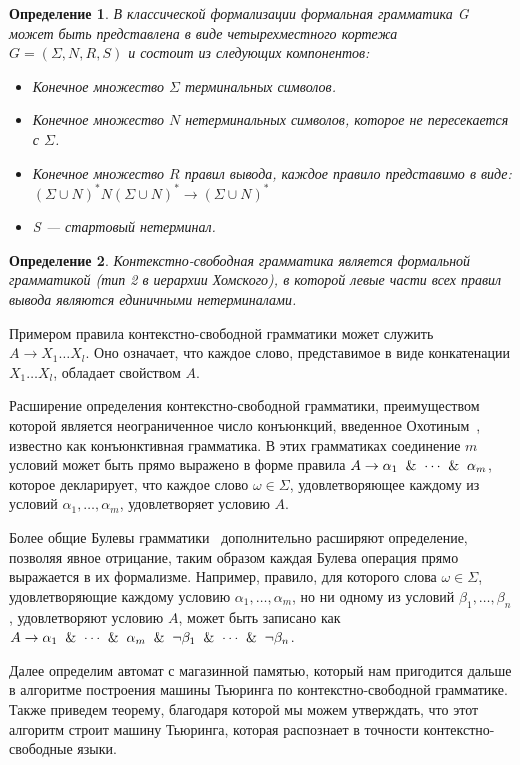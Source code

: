 \documentclass[14pt]{matmex-diploma-custom}
\newtheorem{defn}{Определение}[subsection]
\begin{document}
\begin{defn}
В классической формализации формальная грамматика G может быть представлена 
в виде четырехместного кортежа $G = (\Sigma, N, R, S)$ и состоит из следующих компонентов:
\begin{itemize}
    \item Конечное множество $\Sigma$ терминальных символов.
    \item Конечное множество $N$ нетерминальных символов, которое не пересекается с $\Sigma$.
    \item Конечное множество $R$ правил вывода, каждое правило представимо в виде: 
    $(\Sigma \cup N)^{*}N(\Sigma \cup N)^{*} \to (\Sigma \cup N)^{*}$
    \item S --- стартовый нетерминал.
\end{itemize}
\end{defn}

\begin{defn}
Контекстно-свободная грамматика является формальной грамматикой
(тип 2 в иерархии Хомского), в которой левые части всех правил вывода 
являются единичными нетерминалами. 
\end{defn}

Примером правила контекстно-свободной грамматики может служить $A \to X_1 \dots X_l$.
Оно означает, что каждое слово, представимое в виде конкатенации $X_1 \dots X_l$, 
обладает свойством $A$.

Расширение определения контекстно-свободной грамматики, 
преимуществом которой является неограниченное число конъюнкций, 
введенное Охотиным~\cite{ConjGrammars}, известно как конъюнктивная грамматика. 
В этих грамматиках соединение $m$ условий может быть прямо выражено 
в форме правила $A \to \alpha_{1}\And \dots \And \alpha_{m}$, которое декларирует, 
что каждое слово $\omega \in \Sigma$, удовлетворяющее каждому из условий $\alpha_{1},\dots,\alpha_{m}$, удовлетворяет условию $A$.

Более общие Булевы грамматики~\cite{BoolGrammars} дополнительно расширяют определение, 
позволяя явное отрицание, таким образом каждая Булева операция прямо выражается в их формализме. 
Например, правило, для которого слова $\omega \in \Sigma$, удовлетворяющие каждому условию
$\alpha_{1},\dots,\alpha_{m}$, но ни одному из условий $\beta_{1}, \dots, \beta_{n}$, 
удовлетворяют условию $A$, может быть записано как 
$A\to \alpha_{1}\And \dots \And \alpha_{m}\And \lnot \beta_{1}\And \dots \And \lnot \beta_{n}$.

Далее определим автомат с магазинной памятью, который нам пригодится дальше в алгоритме
построения машины Тьюринга по контекстно-свободной грамматике. Также приведем теорему, благодаря которой мы можем
утверждать, что этот алгоритм строит машину Тьюринга, которая распознает в точности контекстно-свободные
языки.
\end{document}
